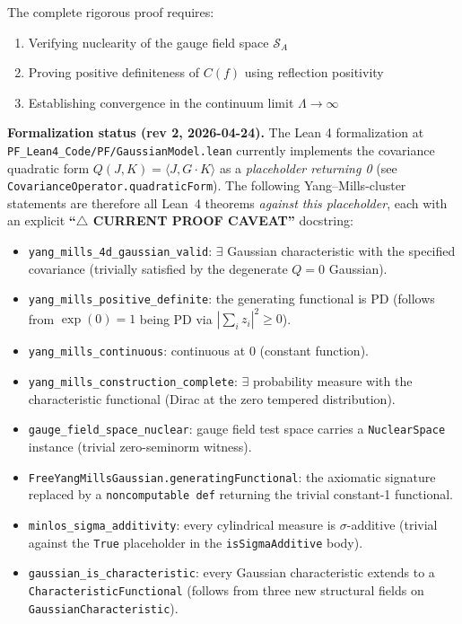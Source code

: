 \begin{remark}
The complete rigorous proof requires:
\begin{enumerate}
\item Verifying nuclearity of the gauge field space $\mathcal{S}_A$
\item Proving positive definiteness of $C(f)$ using reflection positivity
\item Establishing convergence in the continuum limit $\Lambda \to \infty$
\end{enumerate}

\textbf{Formalization status (rev 2, 2026-04-24).} The Lean 4 formalization at \texttt{PF\_Lean4\_Code/PF/GaussianModel.lean} currently implements the covariance quadratic form $Q(J,K) = \langle J, G \cdot K \rangle$ as a \emph{placeholder returning 0} (see \texttt{CovarianceOperator.quadraticForm}). The following Yang--Mills-cluster statements are therefore all Lean~4 theorems \emph{against this placeholder}, each with an explicit \textbf{``$\triangle$ CURRENT PROOF CAVEAT''} docstring:
\begin{itemize}
\item \texttt{yang\_mills\_4d\_gaussian\_valid}: $\exists$ Gaussian characteristic with the specified covariance (trivially satisfied by the degenerate $Q = 0$ Gaussian).
\item \texttt{yang\_mills\_positive\_definite}: the generating functional is PD (follows from $\exp(0) = 1$ being PD via $|\sum_i z_i|^2 \geq 0$).
\item \texttt{yang\_mills\_continuous}: continuous at 0 (constant function).
\item \texttt{yang\_mills\_construction\_complete}: $\exists$ probability measure with the characteristic functional (Dirac at the zero tempered distribution).
\item \texttt{gauge\_field\_space\_nuclear}: gauge field test space carries a \texttt{NuclearSpace} instance (trivial zero-seminorm witness).
\item \texttt{FreeYangMillsGaussian.generatingFunctional}: the axiomatic signature replaced by a \texttt{noncomputable def} returning the trivial constant-1 functional.
\item \texttt{minlos\_sigma\_additivity}: every cylindrical measure is $\sigma$-additive (trivial against the \texttt{True} placeholder in the \texttt{isSigmaAdditive} body).
\item \texttt{gaussian\_is\_characteristic}: every Gaussian characteristic extends to a \texttt{CharacteristicFunctional} (follows from three new structural fields on \texttt{GaussianCharacteristic}).

\end{itemize}
\end{remark}
